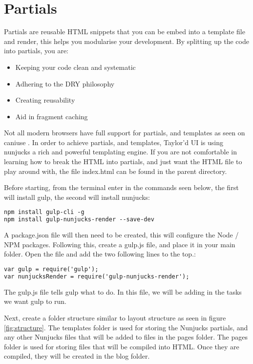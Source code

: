 \newpage
\chapter*{Partials}


Partials are reusable HTML snippets that you can be embed into a template file and render, this helps you modularise your development. By splitting up the code into partials, you are:

\begin{itemize}
	\item Keeping your code clean and systematic
	\item Adhering to the DRY philosophy
	\item Creating reusability
	\item Aid in fragment caching
\end{itemize}

Not all modern browsers have full support for partials, and templates as seen on caniuse \citep{CANI17}. In order to achieve partials, and templates, Taylor'd UI is using nunjucks a rich and powerful templating engine. If you are not comfortable in learning how to break the HTML into partials, and just want the HTML file to play around with, the file index.html can be found in the parent directory.

Before starting, from the terminal enter in the commands seen below, the first will install gulp, the second will install nunjucks:

\begin{lstlisting}[language=HTML]
npm install gulp-cli -g
npm install gulp-nunjucks-render --save-dev
\end{lstlisting}

A package.json file will then need to be created, this will configure the Node / NPM packages. Following this, create a gulp.js file, and place it in your main folder. Open the file and add the two following lines to the top.:

\begin{lstlisting}[language=HTML]
var gulp = require('gulp');
var nunjucksRender = require('gulp-nunjucks-render');
\end{lstlisting}

The gulp.js file tells gulp what to do. In this file, we will be adding in the tasks we want gulp to run.

Next, create a folder structure similar to layout structure as seen in figure \ref{fig:structure}. The templates folder is used for storing the Nunjucks partials, and any other Nunjucks files that will be added to files in the pages folder. The pages folder is used for storing files that will be compiled into HTML. Once they are compiled, they will be created in the blog folder.

